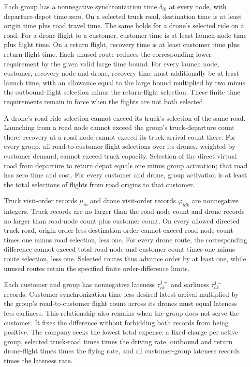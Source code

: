 \documentclass[10pt]{article}
\begin{document}
Each group has a nonnegative synchronization time $\delta_{ik}$ at every node, with departure-depot time zero. On a selected truck road, destination time is at least origin time plus road travel time. The same holds for a drone's selected ride on a road. For a drone flight to a customer, customer time is at least launch-node time plus flight time. On a return flight, recovery time is at least customer time plus return flight time. Each unused route reduces the corresponding lower requirement by the given valid large time bound. For every launch node, customer, recovery node and drone, recovery time must additionally be at least launch time, with an allowance equal to the large bound multiplied by two minus the outbound-flight selection minus the return-flight selection. These finite time requirements remain in force when the flights are not both selected.

A drone's road-ride selection cannot exceed its truck's selection of the same road. Launching from a road node cannot exceed the group's truck-departure count there; recovery at a road node cannot exceed its truck-arrival count there. For every group, all road-to-customer flight selections over its drones, weighted by customer demand, cannot exceed truck capacity. Selection of the direct virtual road from departure to return depot equals one minus group activation; that road has zero time and cost. For every customer and drone, group activation is at least the total selections of flights from road origins to that customer.

Truck visit-order records $\mu_{ik}$ and drone visit-order records $\varphi_{idk}$ are nonnegative integers. Truck records are no larger than the road-node count and drone records no larger than road-node count plus customer count. On every allowed directed truck road, origin order less destination order cannot exceed road-node count times one minus road selection, less one. For every drone route, the corresponding difference cannot exceed total road-node and customer count times one minus route selection, less one. Selected routes thus advance order by at least one, while unused routes retain the specified finite order-difference limits.

Each customer and group has nonnegative lateness $\tau_{ck}^{1+}$ and earliness $\tau_{ck}^{1-}$ records. Customer synchronization time less desired latest arrival multiplied by the group's road-to-customer flight count across its drones must equal lateness less earliness. This relationship also remains when the group does not serve the customer. It fixes the difference without forbidding both records from being positive. The company seeks the lowest total expense: a fixed charge per active group, selected truck-road times times the driving rate, outbound and return drone-flight times times the flying rate, and all customer-group lateness records times the lateness rate.
\end{document}
